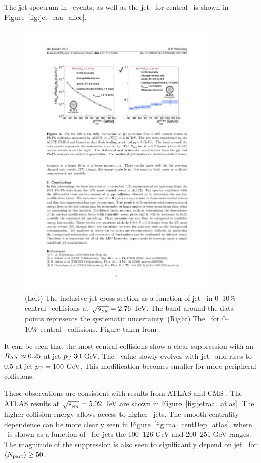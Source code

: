 The jet spectrum in \pbpb\ events, as well as the jet \RAA\ for central \pbpb\ is shown in Figure~\ref{fig:jet_raa_alice}.
\begin{figure}[htbp]
\begin{center}
\includegraphics[width=0.85\textwidth]{figures/jetMeasurements/jet_raa_alice}
\caption{(Left) The inclusive jet cross section as a function of jet \pt\ in 0--10\% central \pbpb\ collisions at $\mbox{$\sqrt{s_{_\text{NN}}}$} = 2.76$ TeV.
The band around the data points represents the systematic uncertainty.
(Right) The \RAA\ for 0--10\% central \pbpb\ collisions.
Figure taken from \cite{Reed_2013}.}
\label{fig:jet_yields}
\end{center}
\end{figure}

It can be seen that the most central collisions show a clear suppression with an $\mbox{$R_{\rm AA}$} \approx 0.25$ at jet $\mbox{$p_{\mathrm{T}}$}\ 30$ GeV.
The \RAA\ value slowly evolves with jet \pt\ and rises to 0.5 at jet $\mbox{$p_{\mathrm{T}}$} = 100$ GeV.
This modification becomes smaller for more peripheral collisions.

These observations are consistent with results from ATLAS and CMS \cite{Aad:2014bxa, 2019108, Khachatryan:2016jfl}.
The ATLAS results at $\mbox{$\sqrt{s_{_\text{NN}}}$} = 5.02$ TeV are shown in Figure~\ref{fig:jetraa_atlas}.
The higher collision energy allows access to higher \pt\ jets.
The smooth centrality dependence can be more clearly seen in Figure~\ref{fig:raa_centDep_atlas}, where \RAA\ is shown as a function of \ANpart\ for jets the 100--126 GeV and 200--251 GeV ranges.
The magnitude of the suppression is also seen to significantly depend on jet \pt\ for $\mbox{$\langle N_{\mathrm{part}}\rangle$} \geq 50$.


